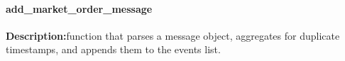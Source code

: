 \paragraph{add\_market\_order\_message}
\hfill\break
\textbf{Description:}function that parses a message object, aggregates for duplicate timestamps, and appends them to the events list. 
